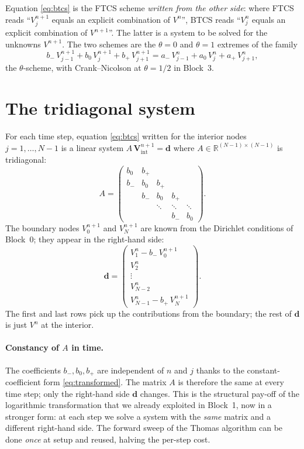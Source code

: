 \documentclass[11pt,a4paper]{article}
\begin{document}
Equation \eqref{eq:btcs} is the FTCS scheme \emph{written from the
other side}: where FTCS reads ``$V_j^{n+1}$ equals an explicit
combination of $V^n$'', BTCS reads ``$V_j^n$ equals an explicit
combination of $V^{n+1}$''. The latter is a system to be solved for
the unknowns $V^{n+1}$. The two schemes are the $\theta = 0$ and
$\theta = 1$ extremes of the family
\[
b_-\,V_{j-1}^{n+1} + b_0\,V_j^{n+1} + b_+\,V_{j+1}^{n+1}
= a_-\,V_{j-1}^n + a_0\,V_j^n + a_+\,V_{j+1}^n,
\]
the $\theta$-scheme, with Crank--Nicolson at $\theta = 1/2$ in
Block~3.

\section{The tridiagonal system}

For each time step, equation \eqref{eq:btcs} written for the interior
nodes $j = 1, \dots, N-1$ is a linear system $A\,\mathbf{V}^{n+1}_{\mathrm{int}} = \mathbf{d}$
where $A \in \mathbb{R}^{(N-1)\times(N-1)}$ is tridiagonal:
\[
A = \begin{pmatrix}
b_0 & b_+ &        &        & \\
b_- & b_0 & b_+    &        & \\
    & b_- & b_0    & b_+    & \\
    &     & \ddots & \ddots & \ddots \\
    &     &        & b_-    & b_0
\end{pmatrix}.
\]
The boundary nodes $V_0^{n+1}$ and $V_N^{n+1}$ are known from the
Dirichlet conditions of Block~0; they appear in the right-hand side:
\begin{equation}
\mathbf{d} = \begin{pmatrix}
V_1^n - b_-\,V_0^{n+1} \\
V_2^n \\
\vdots \\
V_{N-2}^n \\
V_{N-1}^n - b_+\,V_N^{n+1}
\end{pmatrix}.
\label{eq:rhs}
\end{equation}
The first and last rows pick up the contributions from the
boundary; the rest of $\mathbf{d}$ is just $V^n$ at the interior.

\paragraph{Constancy of $A$ in time.} The coefficients $b_-, b_0, b_+$
are independent of $n$ and $j$ thanks to the constant-coefficient
form \eqref{eq:transformed}. The matrix $A$ is therefore the same at
every time step; only the right-hand side $\mathbf{d}$ changes.
This is the structural pay-off of the logarithmic transformation
that we already exploited in Block~1, now in a stronger form: at
each step we solve a system with the \emph{same} matrix and a
different right-hand side. The forward sweep of the Thomas algorithm
can be done \emph{once} at setup and reused, halving the per-step
cost.
\end{document}
